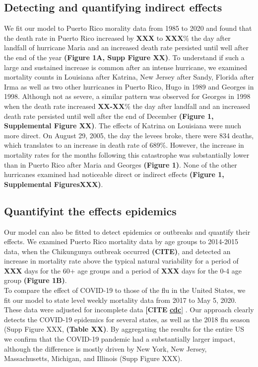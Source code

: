 \documentclass[11pt]{article}
\begin{document}
\subsection{Detecting and quantifying indirect effects}
\label{subsec:effects}
We fit our model to Puerto Rico morality data from 1985 to 2020 and found that the death rate in Puerto Rico increased by \textbf{XXX} to \textbf{XXX}\% the day after landfall of hurricane Maria and an increased death rate persisted until well after the end of the year \textbf{(Figure 1A, Supp Figure XX)}. To understand if such a large and sustained increase is common after an intense hurricane, we examined mortality counts in Louisiana after Katrina, New Jersey after Sandy, Florida after Irma as well as two other hurricanes in Puerto Rico, Hugo in 1989 and Georges in 1998.  Although not as severe, a similar pattern was observed for Georges in 1998 when the death rate increased \textbf{XX-XX}\% the day after landfall and an increased death rate persisted until well after the end of December \textbf{(Figure 1, Supplemental Figure XX)}. The effects of Katrina on Louisiana were much more direct. On August 29, 2005, the day the levees broke, there were 834 deaths, which translates to an increase in death rate of 689\%. However, the increase in mortality rates for the months following this catastrophe was substantially lower than in Puerto Rico after Maria and Georges \textbf{(Figure 1)}. None of the other hurricanes examined had noticeable direct or indirect effects \textbf{(Figure 1, Supplemental FiguresXXX)}.

\subsection{Quantifyint the effects epidemics}
\label{subsec:epidemics}
Our model can also be fitted to detect epidemics or outbreaks and quantify their effects. We examined Puerto Rico mortality data by age groups to 2014-2015 data, when the Chikungunya outbreak occurred \textbf{(CITE)}, and detected an increase in mortality rate above the typical natural variability for a period of \textbf{XXX} days for the 60+ age groups and a period of \textbf{XXX} days for the  0-4 age group \textbf{(Figure 1B)}. \\

To compare the effect of COVID-19 to those of the flu in the United States, we fit our model to state level weekly mortality data from 2017 to May 5, 2020. These data were adjusted for incomplete data \textbf{[CITE }\href{https://www.cdc.gov/nchs/nvss/vsrr/covid19/excess_deaths.htm}{\textbf{cdc}]} . Our approach clearly detects the COVID-19 epidemics for several states, as well as the 2018 flu season (Supp Figure XXX, \textbf{(Table XX)}. By aggregating the results for the entire US we confirm that the COVID-19 pandemic had a substantially larger impact, although the difference is mostly driven by New York, New Jersey, Massachusetts, Michigan, and Illinois (Supp Figure XXX).
\end{document}
